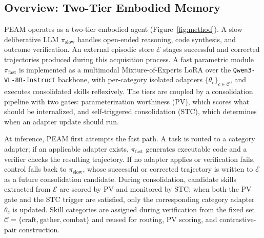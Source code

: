 \documentclass[11pt]{article}
\begin{document}
\subsection{Overview: Two-Tier Embodied Memory}
PEAM operates as a two-tier embodied agent (Figure~\ref{fig:method}). A slow deliberative LLM $\pi_{\text{slow}}$ handles open-ended reasoning, code synthesis, and outcome verification. An external episodic store $\mathcal{E}$ stages successful and corrected trajectories produced during this acquisition process. A fast parametric module $\pi_{\text{fast}}$ is implemented as a multimodal Mixture-of-Experts LoRA over the \texttt{Qwen3-VL-8B-Instruct} backbone, with per-category isolated adapters $\{\theta_c\}_{c \in \mathcal{C}}$, and executes consolidated skills reflexively. The tiers are coupled by a consolidation pipeline with two gates: parameterization worthiness (PV), which scores what should be internalized, and self-triggered consolidation (STC), which determines when an adapter update should run.

At inference, PEAM first attempts the fast path. A task is routed to a category adapter; if an applicable adapter exists, $\pi_{\text{fast}}$ generates executable code and a verifier checks the resulting trajectory. If no adapter applies or verification fails, control falls back to $\pi_{\text{slow}}$, whose successful or corrected trajectory is written to $\mathcal{E}$ as a future consolidation candidate. During consolidation, candidate skills extracted from $\mathcal{E}$ are scored by PV and monitored by STC; when both the PV gate and the STC trigger are satisfied, only the corresponding category adapter $\theta_c$ is updated. Skill categories are assigned during verification from the fixed set $\mathcal{C}=\{\text{craft},\text{gather},\text{combat}\}$ and reused for routing, PV scoring, and contrastive-pair construction.
\end{document}
